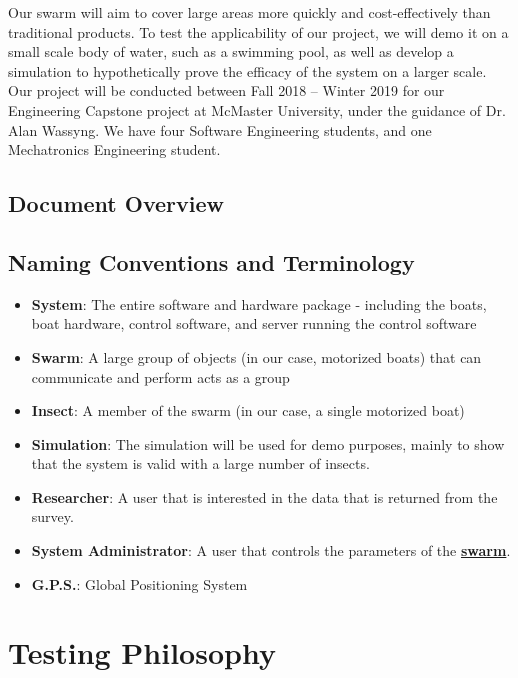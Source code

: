 \documentclass[11pt]{article}
\begin{document}
Our swarm will aim to cover large areas more quickly and cost-effectively than traditional products. To test the applicability of our project, we will demo it on a small scale body of water, such as a swimming pool, as well as develop a simulation to hypothetically prove the efficacy of the system on a larger scale.\\

Our project will be conducted between Fall 2018 – Winter 2019 for our Engineering Capstone project at McMaster University, under the guidance of Dr. Alan Wassyng. We have four Software Engineering students, and one Mechatronics Engineering student.

\subsection{Document Overview}

\subsection{Naming Conventions and Terminology}

\label{sec:definitions}
\begin{itemize}
\item \textbf{System}: The entire software and hardware package - including the boats,
boat hardware, control software, and server running the control software
\item \textbf{Swarm}: A large group of objects (in our case, motorized boats) that can communicate and perform acts as a group
\item \textbf{Insect}: A member of the swarm (in our case, a single motorized boat)
\item \textbf{Simulation}: The simulation will be used for demo purposes, mainly to show that
the system is valid with a large number of insects.
\item \textbf{Researcher}: A user that is interested in the data that is returned from the survey.
\item \textbf{System Administrator}: A user that controls the parameters of the \hyperref[sec:definitions]{\textbf{swarm}}.
\item \textbf{G.P.S.}: Global Positioning System
\end{itemize}

\section{Testing Philosophy}
\end{document}
